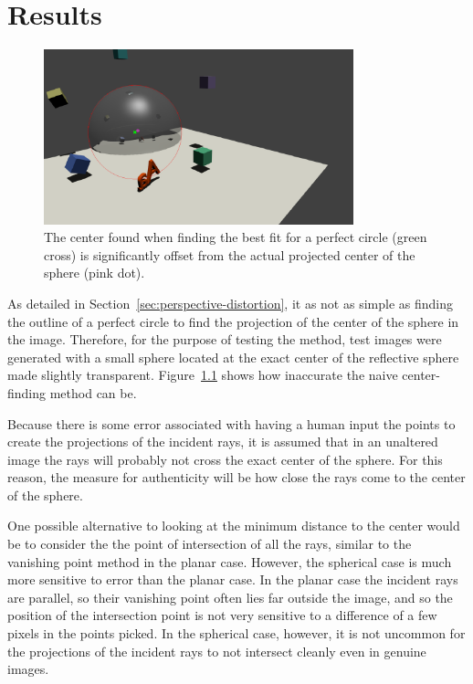 \documentclass{thesis}
\begin{document}



\chapter{Results}
\begin{figure}[h]
	\centering
    	\includegraphics[width=0.8\textwidth]{center-error}
	\caption{The center found when finding the best fit for a perfect circle (green cross) is significantly offset from the actual projected center of the sphere (pink dot).}
	\label{center-error}
\end{figure}

As detailed in Section~\ref{sec:perspective-distortion}, it as not as simple as finding the outline of a perfect circle to find the projection of the center of the sphere in the image. Therefore, for the purpose of testing the method, test images were generated with a small sphere located at the exact center of the reflective sphere made slightly transparent. Figure~\ref{center-error} shows how inaccurate the naive center-finding method can be.

Because there is some error associated with having a human input the points to create the projections of the incident rays, it is assumed that in an unaltered image the rays will probably not cross the exact center of the sphere. For this reason, the measure for authenticity will be how close the rays come to the center of the sphere.

One possible alternative to looking at the minimum distance to the center would be to consider the the point of intersection of all the rays, similar to the vanishing point method in the planar case. However, the spherical case is much more sensitive to error than the planar case. In the planar case the incident rays are parallel, so their vanishing point often lies far outside the image, and so the position of the intersection point is not very sensitive to a difference of a few pixels in the points picked. In the spherical case, however, it is not uncommon for the projections of the incident rays to not intersect cleanly even in genuine images.
\end{document}
